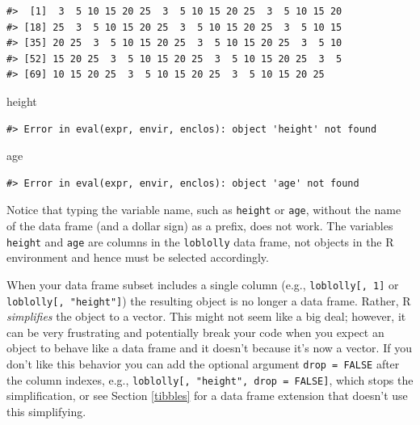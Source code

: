 \documentclass[
  11pt,
]{krantz}
\newenvironment{Shaded}{\begin{snugshade}}{\end{snugshade}}
\newcommand{\NormalTok}[1]{#1}
\newcommand{\OperatorTok}[1]{\textcolor[rgb]{0.81,0.36,0.00}{\textbf{#1}}}
\theoremstyle{definition}
\theoremstyle{definition}
\theoremstyle{definition}
\theoremstyle{definition}
\theoremstyle{remark}
\begin{document}
\begin{Shaded}
\end{Shaded}

\begin{verbatim}
#>  [1]  3  5 10 15 20 25  3  5 10 15 20 25  3  5 10 15 20
#> [18] 25  3  5 10 15 20 25  3  5 10 15 20 25  3  5 10 15
#> [35] 20 25  3  5 10 15 20 25  3  5 10 15 20 25  3  5 10
#> [52] 15 20 25  3  5 10 15 20 25  3  5 10 15 20 25  3  5
#> [69] 10 15 20 25  3  5 10 15 20 25  3  5 10 15 20 25
\end{verbatim}

\begin{Shaded}
\begin{Highlighting}[]
\NormalTok{height}
\end{Highlighting}
\end{Shaded}

\begin{verbatim}
#> Error in eval(expr, envir, enclos): object 'height' not found
\end{verbatim}

\begin{Shaded}
\begin{Highlighting}[]
\NormalTok{age}
\end{Highlighting}
\end{Shaded}

\begin{verbatim}
#> Error in eval(expr, envir, enclos): object 'age' not found
\end{verbatim}

Notice that typing the variable name, such as \texttt{height} or \texttt{age}, without the name of the data frame (and a dollar sign) as a prefix, does not work. The variables \texttt{height} and \texttt{age} are columns in the \texttt{loblolly} data frame, not objects in the R environment and hence must be selected accordingly.

When your data frame subset includes a single column (e.g., \texttt{loblolly{[},\ 1{]}} or \texttt{loblolly{[},\ "height"{]}}) the resulting object is no longer a data frame. Rather, R \emph{simplifies} the object to a vector. This might not seem like a big deal; however, it can be very frustrating and potentially break your code when you expect an object to behave like a data frame and it doesn't because it's now a vector. If you don't like this behavior you can add the optional argument \texttt{drop\ =\ FALSE} after the column indexes, e.g., \texttt{loblolly{[},\ "height",\ drop\ =\ FALSE{]}}, which stops the simplification, or see Section \ref{tibbles} for a data frame extension that doesn't use this simplifying.
\end{document}
